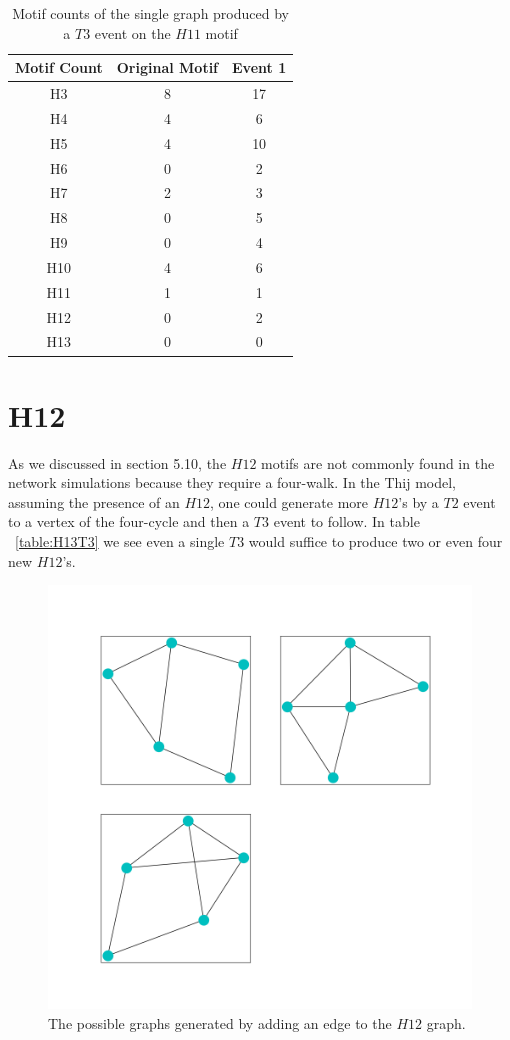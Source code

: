 \begin{table}
    \centering
    \begin{tabular}{||c c c ||} 
    \hline
    Motif Count & Original Motif & Event 1 \\ [0.5ex] 
    \hline\hline
    H3 & 8 & 17 \\ 
    \hline
    H4 & 4 & 6  \\
    \hline
    H5 & 4 & 10 \\
    \hline
    H6 & 0 & 2 \\
    \hline
    H7 & 2 & 3 \\
    \hline
    H8 & 0 & 5 \\
    \hline
    H9 & 0 & 4 \\
    \hline
    H10 & 4 & 6 \\
    \hline
    H11 & 1 & 1 \\
    \hline
    H12 & 0 & 2 \\
    \hline
    H13 & 0 & 0 \\
    \hline
   \end{tabular}
   \caption{Motif counts of the single graph produced by a $T3$ event on the $H11$ motif}
   \label{table:20}
\end{table}

\section{H12}
As we discussed in section 5.10, the $H12$ motifs are not commonly found in the network simulations
because they require a four-walk. In the Thij model, assuming the presence of an $H12$,
one could generate more $H12$'s by a $T2$ event to a vertex of the four-cycle and then a 
$T3$ event to follow. In table ~\ref{table:H13T3} we see even a single $T3$ would suffice to produce two or even four new
$H12$'s.

\begin{figure}
    \includegraphics[width=12cm]{Images/H12_T3_evolution.png}
    \centering
    \caption{The possible graphs generated by adding an edge to the $H12$ graph.}
\end{figure}

